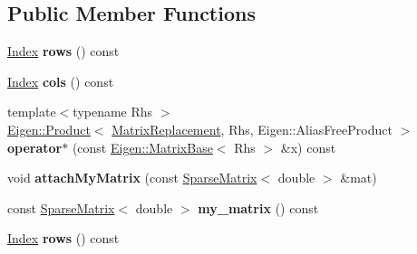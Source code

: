 \subsection*{Public Member Functions}
\begin{DoxyCompactItemize}
\item 
\mbox{\label{class_matrix_replacement_af6f14ddefd9023fc44de03b0d49423e7}} 
\hyperlink{group___core___module_a554f30542cc2316add4b1ea0a492ff02}{Index} {\bfseries rows} () const
\item 
\mbox{\label{class_matrix_replacement_a3688c31c1907e1f895e2b4f0c3a2333e}} 
\hyperlink{group___core___module_a554f30542cc2316add4b1ea0a492ff02}{Index} {\bfseries cols} () const
\item 
\mbox{\label{class_matrix_replacement_aa9bf2f9f11ec5d91576d2c6dbea78acb}} 
{\footnotesize template$<$typename Rhs $>$ }\\\hyperlink{group___core___module_class_eigen_1_1_product}{Eigen\+::\+Product}$<$ \hyperlink{class_matrix_replacement}{Matrix\+Replacement}, Rhs, Eigen\+::\+Alias\+Free\+Product $>$ {\bfseries operator$\ast$} (const \hyperlink{group___core___module_class_eigen_1_1_matrix_base}{Eigen\+::\+Matrix\+Base}$<$ Rhs $>$ \&x) const
\item 
\mbox{\label{class_matrix_replacement_a49a7f2bb559863898161cd450d58915a}} 
void {\bfseries attach\+My\+Matrix} (const \hyperlink{group___sparse_core___module_class_eigen_1_1_sparse_matrix}{Sparse\+Matrix}$<$ double $>$ \&mat)
\item 
\mbox{\label{class_matrix_replacement_a90fb4c6ce766a70ddcff42532359d4b8}} 
const \hyperlink{group___sparse_core___module_class_eigen_1_1_sparse_matrix}{Sparse\+Matrix}$<$ double $>$ {\bfseries my\+\_\+matrix} () const
\item 
\mbox{\label{class_matrix_replacement_af6f14ddefd9023fc44de03b0d49423e7}} 
\hyperlink{group___core___module_a554f30542cc2316add4b1ea0a492ff02}{Index} {\bfseries rows} () const
\item 
\mbox{\label{class_matrix_replacement_a3688c31c1907e1f895e2b4f0c3a2333e}} 

\end{DoxyCompactItemize}

